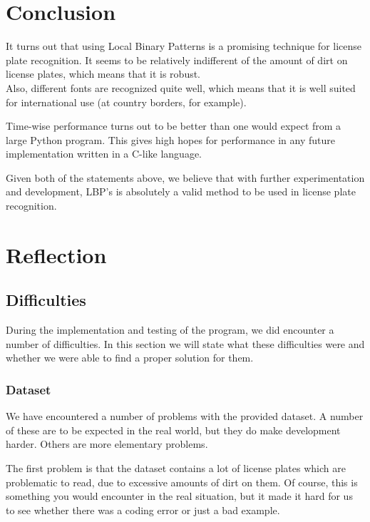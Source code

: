 \documentclass[a4paper]{article}
\begin{document}
\section{Conclusion}

It turns out that using Local Binary Patterns is a promising technique for
license plate recognition. It seems to be relatively indifferent of the amount
of dirt on license plates, which means that it is robust. \\
Also, different fonts are recognized quite well, which means that it is well
suited for international use (at country borders, for example).

Time-wise performance turns out to be better than one would expect from a large
Python program. This gives high hopes for performance in any future
implementation written in a C-like language.

Given both of the statements above, we believe that with further
experimentation and development, LBP's is absolutely a valid method to be used
in license plate recognition.

\section{Reflection}

\subsection{Difficulties}

During the implementation and testing of the program, we did encounter a
number of difficulties. In this section we will state what these difficulties
were and whether we were able to find a proper solution for them.

\subsubsection*{Dataset}

We have encountered a number of problems with the provided dataset. A number of
these are to be expected in the real world, but they do make development
harder. Others are more elementary problems.

The first problem is that the dataset contains a lot of license plates which
are problematic to read, due to excessive amounts of dirt on them. Of course,
this is something you would encounter in the real situation, but it made it
hard for us to see whether there was a coding error or just a bad example.
\end{document}
